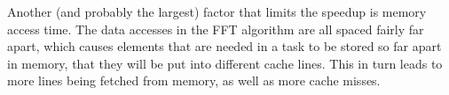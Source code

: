 Another (and probably the largest) factor that limits the speedup is memory access time. The data accesses in the FFT algorithm are all spaced fairly far apart, which causes elements that are needed in a task to be stored so far apart in memory,
that they will be put into different cache lines. This in turn leads to more lines being fetched from memory, as well as more cache misses.
